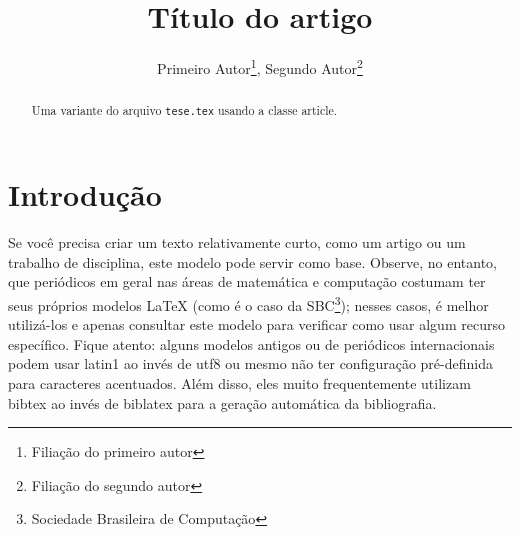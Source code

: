 \documentclass[a4paper,12pt,twoside,english,brazilian]{article}
\title{Título do artigo}
\author{
  Primeiro Autor\thanks{Filiação do primeiro autor},
  Segundo Autor\thanks{Filiação do segundo autor}
}
\date{}
\begin{document}
\maketitle

\begin{abstract}
  Uma variante do arquivo \texttt{tese.tex} usando a classe \textsf{article}.
\end{abstract}

\section{Introdução}

Se você precisa criar um texto relativamente curto, como um artigo ou
um trabalho de disciplina, este modelo pode servir como base. Observe,
no entanto, que periódicos em geral nas áreas de matemática e computação
costumam ter seus próprios modelos \LaTeX{} (como é o caso da
SBC\footnote{Sociedade Brasileira de Computação}\nocite{sbctemplate});
nesses casos, é melhor utilizá-los e apenas consultar este modelo para
verificar como usar algum recurso específico. Fique atento: alguns modelos
antigos ou de periódicos internacionais podem usar \textsf{latin1} ao
invés de \textsf{utf8} ou mesmo não ter configuração pré-definida para
caracteres acentuados. Além disso, eles muito frequentemente utilizam
bibtex ao invés de biblatex para a geração automática da bibliografia.

\printbibliography[
  title=\refname\label{bibliografia}, %
]
\end{document}
